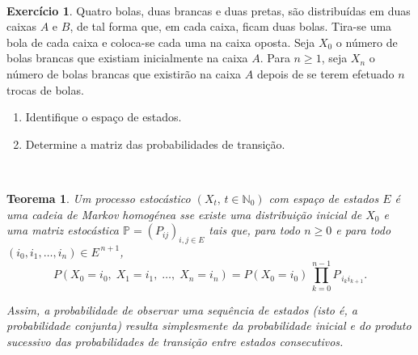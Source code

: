 \documentclass[
  11pt,
  a4paper,
]{book}
\newtheorem{theorem}{Teorema}[chapter]
\theoremstyle{definition}
\theoremstyle{definition}
\theoremstyle{definition}
\newtheorem{exercise}{Exercício}[chapter]
\theoremstyle{definition}
\theoremstyle{remark}
\begin{document}
\(\,\)

\begin{exercise}

Quatro bolas, duas brancas e duas pretas, são distribuídas em duas caixas \(A\) e \(B\), de tal forma que, em cada caixa, ficam duas bolas. Tira-se uma bola de cada caixa e coloca-se cada uma na caixa oposta. Seja \(X_0\) o número de bolas brancas que existiam inicialmente na caixa \(A\). Para \(n \geq 1\), seja \(X_n\) o número de bolas brancas que existirão na caixa \(A\) depois de se terem efetuado \(n\) trocas de bolas.

\begin{enumerate}
\def\labelenumi{(\alph{enumi})}
\item
  Identifique o espaço de estados.
\item
  Determine a matriz das probabilidades de transição.
\end{enumerate}

\end{exercise}

\(\,\)

\begin{theorem}
Um processo estocástico \((X_t,\, t \in \mathbb{N}_0)\) com espaço de estados \(E\) é uma cadeia de Markov homogénea sse existe uma distribuição inicial de \(X_0\) e uma matriz estocástica \(\mathbb{P} = (P_{ij})_{i,j \in E}\) tais que, para todo \(n\ge 0\) e para todo \((i_0,i_1,\dots,i_n)\in E^{\,n+1}\),
\[
P(X_0=i_0,\; X_1=i_1,\; \ldots,\; X_n=i_n)
= P(X_0=i_0)\,\prod_{k=0}^{n-1} P_{\,i_k i_{k+1}}.
\]

Assim, a probabilidade de observar uma sequência de estados (isto é, a probabilidade conjunta) resulta simplesmente da probabilidade inicial e do produto sucessivo das probabilidades de transição entre estados consecutivos.
\end{theorem}

\(\,\)
\end{document}
